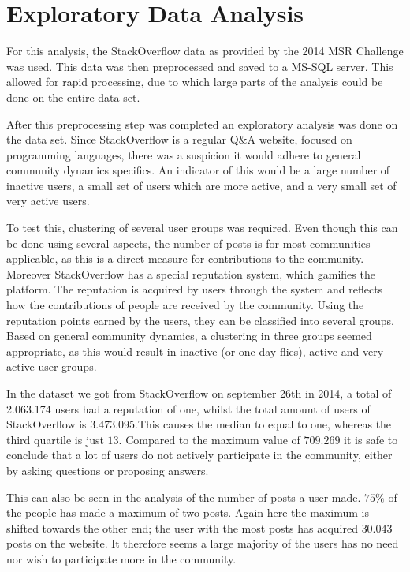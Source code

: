 \documentclass[conference]{IEEEtran}
\begin{document}
\section{Exploratory Data Analysis}

For this analysis, the StackOverflow data as provided by the 2014 MSR Challenge
was used. This data was then preprocessed and saved to a MS-SQL server. This
allowed for rapid processing, due to which large parts of the analysis could be
done on the entire data set.

After this preprocessing step was completed an exploratory analysis was done on
the data set. Since StackOverflow is a regular Q\&A website, focused on
programming languages, there was a suspicion it would adhere to general
community dynamics specifics. An indicator of this would be a large number of
inactive users, a small set of users which are more active, and a very small
set of very active users.

To test this, clustering of several user groups was required. Even though  this
can be done using several aspects, the number of posts is for most communities
applicable, as this is a direct measure for contributions to the community.
Moreover StackOverflow has a special reputation system, which gamifies the
platform. The reputation is acquired by users through the system and reflects
how the contributions of people are received by the community. Using the
reputation points earned by the users, they can be classified into several
groups. Based  on general community dynamics, a clustering in three groups
seemed appropriate, as this would result in inactive (or one-day flies), active
and very active user groups.

In the dataset we got from StackOverflow on september 26th in 2014, a total of
2.063.174 users had a reputation of one, whilst the total amount of users of
StackOverflow is 3.473.095.This causes the median to  equal to one, whereas the
third quartile is just $13$. Compared to the maximum value of $709.269$ it is
safe to conclude that a lot of users do not actively participate in the
community, either by asking questions or proposing answers.

This can also be seen in the analysis of the number of posts a user made.
$75\%$ of the people has made a maximum of two posts. Again here the maximum is
shifted towards the other end; the user with the most posts has acquired
$30.043$ posts on the website. It therefore seems a large majority of the users
has no need nor wish to participate more in the community.
\end{document}

